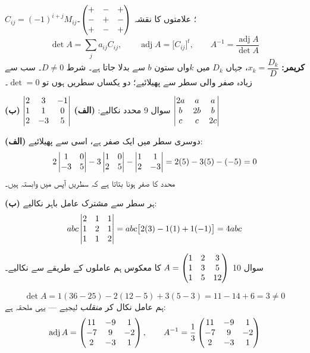 \begin{nukta}
\(C_{ij}=(-1)^{i+j}M_{ij}\)؛ علامتوں کا نقشہ \(\begin{pmatrix}+&-&+\\-&+&-\\+&-&+\end{pmatrix}\)۔
\[
\det A=\sum_j a_{ij}C_{ij},\qquad
\operatorname{adj}A=\bigl[C_{ij}\bigr]^{t},\qquad
A^{-1}=\frac{\operatorname{adj}A}{\det A}
\]
\textbf{کریمر:} \(x_k=\dfrac{D_k}{D}\)، جہاں \(D_k\) میں \(k\)واں ستون \(b\) سے
بدلا جاتا ہے۔ شرط \(D\neq0\)۔ سب سے زیادہ صفر والی سطر سے پھیلائیے؛ دو یکساں
سطریں ہوں تو \(\det=0\)۔
\end{nukta}

\begin{sawal}{سوال \textenglish{9}}
محدد نکالیے: \quad \textbf{(الف)} \(\begin{vmatrix}2&3&-1\\1&1&0\\2&-3&5\end{vmatrix}\) \qquad
\textbf{(ب)} \(\begin{vmatrix}2a&a&a\\b&2b&b\\c&c&2c\end{vmatrix}\)
\end{sawal}

\begin{hal}
\textbf{(الف)} دوسری سطر میں ایک صفر ہے، اسی سے پھیلائیے:
\[
2\begin{vmatrix}1&0\\-3&5\end{vmatrix}-3\begin{vmatrix}1&0\\2&5\end{vmatrix}-\begin{vmatrix}1&1\\2&-3\end{vmatrix}=2(5)-3(5)-(-5)=0
\]
محدد کا صفر ہونا بتاتا ہے کہ سطریں آپس میں وابستہ ہیں۔

\textbf{(ب)} ہر سطر سے مشترک عامل باہر نکالیے:
\[
abc\begin{vmatrix}2&1&1\\1&2&1\\1&1&2\end{vmatrix}=abc\bigl[2(3)-1(1)+1(-1)\bigr]=4abc
\]

\end{hal}

\begin{sawal}{سوال \textenglish{10}}
\(A=\begin{pmatrix}1&2&3\\1&3&5\\1&5&12\end{pmatrix}\) کا معکوس ہم عاملوں کے طریقے سے نکالیے۔
\end{sawal}

\begin{hal}
\[
\det A=1(36-25)-2(12-5)+3(5-3)=11-14+6=3\neq0
\]
ہم عامل نکال کر \emph{منقلب} لیجیے --- یہی ملحقہ ہے:
\[
\operatorname{adj}A=\begin{pmatrix}11&-9&1\\-7&9&-2\\2&-3&1\end{pmatrix},
\qquad
A^{-1}=\frac{1}{3}\begin{pmatrix}11&-9&1\\-7&9&-2\\2&-3&1\end{pmatrix}
\]

\end{hal}

